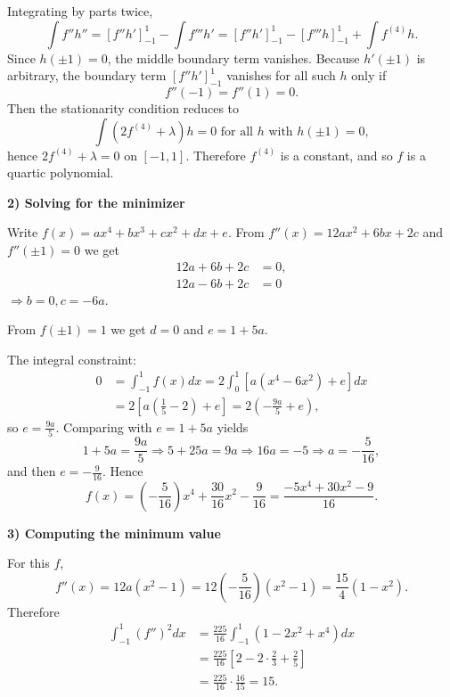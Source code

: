 \documentclass[12pt,a4paper]{article}
\theoremstyle{definition}
\begin{document}
    Integrating by parts twice,
    $$\int f'' h'' = [f'' h']_{-1}^{1} - \int f''' h' = [f'' h']_{-1}^{1} - [f''' h]_{-1}^{1} + \int f^{(4)} h.$$
    Since $h(\pm 1) = 0$, the middle boundary term vanishes. Because $h'(\pm 1)$ is arbitrary, the boundary term $[f'' h']_{-1}^{1}$ vanishes for all such $h$ only if
    $$f''(-1) = f''(1) = 0.$$
    Then the stationarity condition reduces to
    $$\int (2 f^{(4)} + \lambda) h = 0 \text{ for all } h \text{ with } h(\pm 1) = 0,$$
    hence $2 f^{(4)} + \lambda = 0$ on $[-1,1]$. Therefore $f^{(4)}$ is a constant, and so $f$ is a quartic polynomial.

    \textbf{2) Solving for the minimizer}

    Write $f(x) = a x^4 + b x^3 + c x^2 + d x + e$.
    From $f''(x) = 12 a x^2 + 6 b x + 2 c$ and $f''(\pm 1) = 0$ we get
    \begin{align}
        12 a + 6 b + 2 c &= 0,\\
        12 a - 6 b + 2 c &= 0
    \end{align}
    $\Rightarrow b = 0, c = -6 a$.

    From $f(\pm 1) = 1$ we get $d = 0$ and $e = 1 + 5 a$.

    The integral constraint:
    \begin{align}
        0 &= \int_{-1}^{1} f(x) dx = 2 \int_{0}^{1} [a(x^4 - 6 x^2) + e] dx\\
        &= 2 \left[a\left(\frac{1}{5} - 2\right) + e\right] = 2 \left(-\frac{9a}{5} + e\right),
    \end{align}
    so $e = \frac{9 a}{5}$. Comparing with $e = 1 + 5 a$ yields
    $$1 + 5 a = \frac{9 a}{5} \Rightarrow 5 + 25 a = 9 a \Rightarrow 16 a = -5 \Rightarrow a = -\frac{5}{16},$$
    and then $e = -\frac{9}{16}$. Hence
    $$f(x) = \left(-\frac{5}{16}\right) x^4 + \frac{30}{16} x^2 - \frac{9}{16} = \frac{-5 x^4 + 30 x^2 - 9}{16}.$$

    \textbf{3) Computing the minimum value}

    For this $f$,
    $$f''(x) = 12 a (x^2 - 1) = 12\left(-\frac{5}{16}\right)(x^2 - 1) = \frac{15}{4}(1 - x^2).$$
    Therefore
    \begin{align}
        \int_{-1}^{1} (f'')^2 dx &= \frac{225}{16} \int_{-1}^{1} (1 - 2 x^2 + x^4) dx\\
        &= \frac{225}{16} \left[2 - 2 \cdot \frac{2}{3} + \frac{2}{5}\right]\\
        &= \frac{225}{16} \cdot \frac{16}{15} = 15.
    \end{align}
\end{document}

